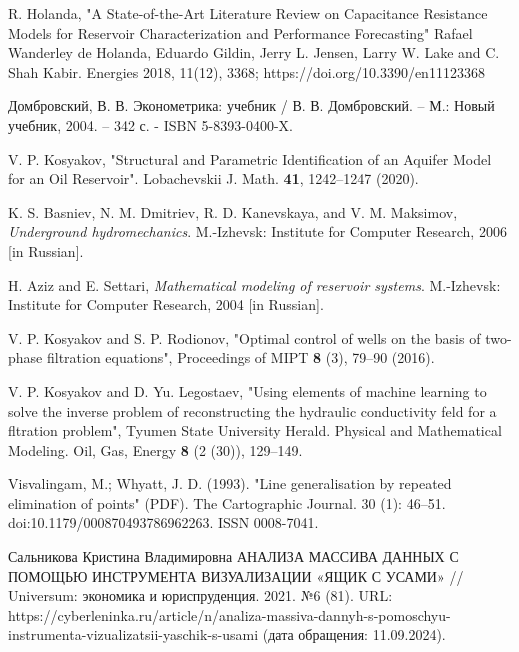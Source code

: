 \documentclass[14pt]{article}
\begin{document}
\newpage

\begin{thebibliography}{20}
		
		 R. Holanda, "A State-of-the-Art Literature Review on Capacitance
		Resistance Models for Reservoir Characterization
		and Performance Forecasting" Rafael Wanderley de Holanda, Eduardo Gildin, Jerry L. Jensen, Larry W. Lake and C. Shah Kabir. Energies 2018, 11(12), 3368; https://doi.org/10.3390/en11123368
		
		 Домбровский, В. В. Эконометрика: учебник / В. В. Домбровский. – М.: Новый учебник, 2004. – 342 с. - ISBN 5-8393-0400-X.
		
		 V. P. Kosyakov, "Structural and Parametric Identification
		of an Aquifer Model for an Oil Reservoir". Lobachevskii J. Math.
		{\bf 41}, 1242--1247 (2020).
		
		 K. S. Basniev, N. M. Dmitriev, R. D. Kanevskaya, and V. M. Maksimov,
		\textit{Underground hydromechanics}. M.-Izhevsk: Institute for
		Computer Research, 2006 [in Russian].
		
		 H. Aziz and E. Settari, \textit{Mathematical modeling of reservoir systems}.
		M.-Izhevsk: Institute for Computer Research, 2004 [in Russian].
		
		 V. P. Kosyakov and S. P. Rodionov, "Optimal control of wells on the basis
		of two-phase filtration equations", Proceedings of MIPT {\bf 8} (3),
		79--90 (2016).
		
		 V. P. Kosyakov and  D. Yu. Legostaev, "Using elements of machine learning to
		solve the inverse problem of reconstructing the hydraulic 
		conductivity feld for a fltration problem", Tyumen State University
		Herald. Physical and Mathematical Modeling. Oil, Gas, Energy {\bf 8}
		(2 (30)), 129--149.
		
		  Visvalingam, M.; Whyatt, J. D. (1993). "Line generalisation by repeated elimination of points" (PDF). The Cartographic Journal. 30 (1): 46–51. doi:10.1179/000870493786962263. ISSN 0008-7041.
		
		  Сальникова Кристина Владимировна АНАЛИЗА МАССИВА ДАННЫХ С ПОМОЩЬЮ ИНСТРУМЕНТА ВИЗУАЛИЗАЦИИ «ЯЩИК С УСАМИ» // Universum: экономика и юриспруденция. 2021. №6 (81). URL: https://cyberleninka.ru/article/n/analiza-massiva-dannyh-s-pomoschyu-instrumenta-vizualizatsii-yaschik-s-usami (дата обращения: 11.09.2024).
		
\end{thebibliography}
	

	
\end{document}
